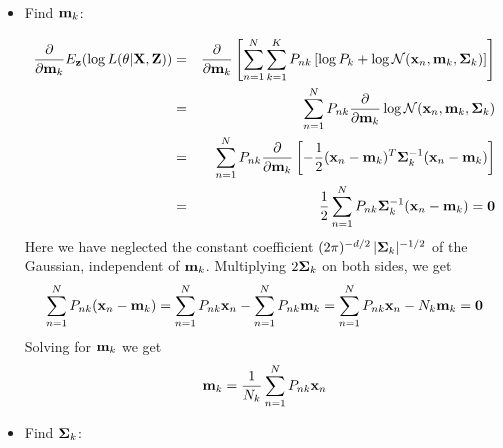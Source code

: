 \documentclass{article}
\begin{document}
\begin{itemize}
\begin{itemize}
  \item Find ${\bf m}_k$:

    \begin{eqnarray}
      \frac{\partial}{\partial{\bf m}_k} E_{\bf z}(\log L(\theta|{\bf X},{\bf Z}))
      &=&\frac{\partial}{\partial{\bf m}_k} 
      \left[\sum_{n=1}^N \sum_{k=1}^K P_{nk}
        \left[\log P_k+\log {\cal N}({\bf x}_n,{\bf m}_k,{\bf\Sigma}_k)\right]\right]
      \nonumber\\
      &=&\sum_{n=1}^N P_{nk}\frac{\partial}{\partial{\bf m}_k} 
      \log {\cal N}({\bf x}_n,{\bf m}_k,{\bf\Sigma}_k)
      \nonumber\\
      &=&\sum_{n=1}^N P_{nk}\frac{\partial}{\partial{\bf m}_k} 
      \left[-\frac{1}{2}({\bf x}_n-{\bf m}_k)^T{\bf\Sigma}_k^{-1}({\bf x}_n-{\bf m}_k)\right]
      \nonumber\\
      &=&\frac{1}{2}\sum_{n=1}^N P_{nk}{\bf\Sigma}_k^{-1}({\bf x}_n-{\bf m}_k)={\bf 0}
      \label{equationmk}
    \end{eqnarray}
    Here we have neglected the constant coefficient 
    $(2\pi)^{-d/2}\,|{\bf\Sigma}_k|^{-1/2}$ of the Gaussian,
    independent of ${\bf m}_k$. Multiplying $2{\bf\Sigma}_k$ on
    both sides, we get
    \begin{equation}
      \sum_{n=1}^N P_{nk}({\bf x}_n-{\bf m}_k)
      =\sum_{n=1}^N P_{nk}{\bf x}_n-\sum_{n=1}^N P_{nk}{\bf m}_k
      =\sum_{n=1}^N P_{nk}{\bf x}_n-N_k{\bf m}_k={\bf 0}
    \end{equation}
    Solving for ${\bf m}_k$ we get
    \begin{equation}
      {\bf m}_k=\frac{1}{N_k}\sum_{n=1}^N P_{nk}{\bf x}_n
    \end{equation}

  \item Find ${\bf\Sigma}_k$:


\end{itemize}
\end{itemize}
\end{document}
